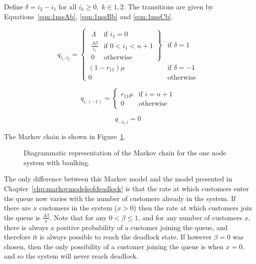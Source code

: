 \documentclass{article}
\begin{document}
Define $\delta = i_2 - i_1$ for all $i_k \geq 0,\; k\in{1, 2}$.
The transitions are given by Equations~\ref{eqn:1nssAb}, \ref{eqn:1nssBb} and \ref{eqn:1nssCb}.

\begin{equation}\label{eqn:1nssAb}
  q_{i_1, i_2} = \left\{
  \begin{array}{rr}
    \left. \begin{array}{rr}
      \Lambda & \text{if } i_1 = 0 \\
      \frac{\Lambda \beta}{i_1} & \text{if } 0 < i_1 < n + 1 \\
      0 & \text{otherwise}
    \end{array} \right\} & \text{if } \delta = 1 \\
    (1 - r_{11})\mu & \text{if } \delta = -1 \\
    0 & \text{otherwise}
  \end{array} \right.
\end{equation}

\begin{equation}\label{eqn:1nssBb}
  q_{i, (-1)} = \left\{
  \begin{array}{rr}
    r_{11}\mu & \text{if } i = n + 1 \\
    0 & \text{otherwise}
  \end{array}
  \right.
\end{equation}

\begin{equation}\label{eqn:1nssCb}
  q_{-1, i} = 0
\end{equation}

The Markov chain is shown in Figure~\ref{fig:1nodeMCbaulking}.

\begin{figure}[!htbp]
  \begin{center}
    
  \end{center}
  \caption{Diagrammatic representation of the Markov chain for the one node system with baulking.}
  \label{fig:1nodeMCbaulking}
\end{figure}

The only difference between this Markov model and the model presented in Chapter~\ref{chp:markovmodelsofdeadlock} is that the rate at which customers enter the queue now varies with the number of customers already in the system. If there are $x$ customers in the system ($x > 0$) then the rate at which customers join the queue is $\frac{\Lambda \beta}{x}$.
Note that for any $0 < \beta \leq 1$, and for any number of customers $x$, there is always a positive probability of a customer joining the queue, and therefore it is always possible to reach the deadlock state. If however $\beta = 0$ was chosen, then the only possibility of a customer joining the queue is when $x = 0$, and so the system will never reach deadlock.
\end{document}
